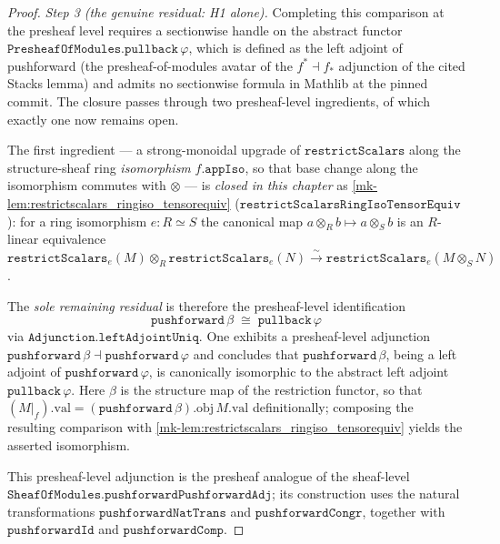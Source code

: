 \begin{proof}
  \emph{Step 3 (the genuine residual: H1 alone).} Completing this comparison at the
  presheaf level requires a sectionwise handle on the abstract functor
  \(\mathtt{PresheafOfModules.pullback}\,\varphi\), which is defined as the left
  adjoint of pushforward (the presheaf-of-modules avatar of the
  \(f^* \dashv f_*\) adjunction of the cited Stacks lemma) and admits no
  sectionwise formula in Mathlib at the pinned commit. The closure passes through
  two presheaf-level ingredients, of which exactly one now remains open.

  The first ingredient --- a strong-monoidal upgrade of
  \(\mathtt{restrictScalars}\) along the structure-sheaf ring \emph{isomorphism}
  \(f.\mathtt{appIso}\), so that base change along the isomorphism commutes with
  \(\otimes\) --- is \emph{closed in this chapter} as
  \ref{mk-lem:restrictscalars_ringiso_tensorequiv}
  (\(\mathtt{restrictScalarsRingIsoTensorEquiv}\)): for a ring isomorphism
  \(e : R \simeq S\) the canonical map \(a \otimes_R b \mapsto a \otimes_S b\) is an
  \(R\)-linear equivalence \(\mathtt{restrictScalars}_e(M) \otimes_R
  \mathtt{restrictScalars}_e(N) \xrightarrow{\sim} \mathtt{restrictScalars}_e(M
  \otimes_S N)\).

  The \emph{sole remaining residual} is therefore the presheaf-level identification
  \[
    \mathtt{pushforward}\,\beta \;\cong\; \mathtt{pullback}\,\varphi
  \]
  via \(\mathtt{Adjunction.leftAdjointUniq}\). One exhibits a
  presheaf-level adjunction
  \(\mathtt{pushforward}\,\beta \dashv \mathtt{pushforward}\,\varphi\) and concludes
  that \(\mathtt{pushforward}\,\beta\), being a left adjoint of
  \(\mathtt{pushforward}\,\varphi\), is canonically isomorphic to the abstract left
  adjoint \(\mathtt{pullback}\,\varphi\). Here \(\beta\) is the structure map of the
  restriction functor, so that \((M|_f).\mathrm{val} =
  (\mathtt{pushforward}\,\beta).\mathrm{obj}\,M.\mathrm{val}\) definitionally;
  composing the resulting comparison with
  \ref{mk-lem:restrictscalars_ringiso_tensorequiv} yields the asserted isomorphism.

  This presheaf-level adjunction is the presheaf analogue of the sheaf-level
  \(\mathtt{SheafOfModules.pushforwardPushforwardAdj}\); its construction uses the
  natural transformations \(\mathtt{pushforwardNatTrans}\) and
  \(\mathtt{pushforwardCongr}\), together with \(\mathtt{pushforwardId}\) and
  \(\mathtt{pushforwardComp}\).


\end{proof}
